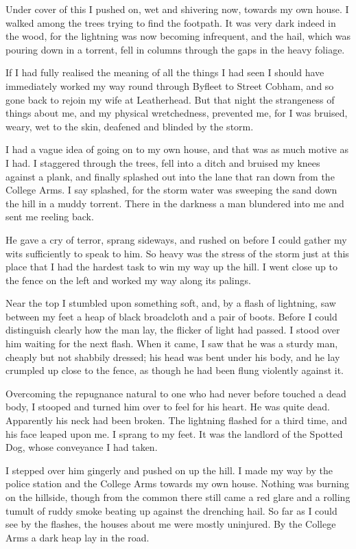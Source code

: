 Under cover of this I pushed on, wet and shivering now, towards my
own house. I walked among the trees trying to find the footpath. It
was very dark indeed in the wood, for the lightning was now
becoming infrequent, and the hail, which was pouring down in a
torrent, fell in columns through the gaps in the heavy foliage.

If I had fully realised the meaning of all the things I had seen I
should have immediately worked my way round through Byfleet to
Street Cobham, and so gone back to rejoin my wife at Leatherhead.
But that night the strangeness of things about me, and my physical
wretchedness, prevented me, for I was bruised, weary, wet to the
skin, deafened and blinded by the storm.

I had a vague idea of going on to my own house, and that was as
much motive as I had. I staggered through the trees, fell into a
ditch and bruised my knees against a plank, and finally splashed
out into the lane that ran down from the College Arms. I say
splashed, for the storm water was sweeping the sand down the hill
in a muddy torrent. There in the darkness a man blundered into me
and sent me reeling back.

He gave a cry of terror, sprang sideways, and rushed on before I
could gather my wits sufficiently to speak to him. So heavy was the
stress of the storm just at this place that I had the hardest task
to win my way up the hill. I went close up to the fence on the left
and worked my way along its palings.

Near the top I stumbled upon something soft, and, by a flash of
lightning, saw between my feet a heap of black broadcloth and a
pair of boots. Before I could distinguish clearly how the man lay,
the flicker of light had passed. I stood over him waiting for the
next flash. When it came, I saw that he was a sturdy man, cheaply
but not shabbily dressed; his head was bent under his body, and he
lay crumpled up close to the fence, as though he had been flung
violently against it.

Overcoming the repugnance natural to one who had never before
touched a dead body, I stooped and turned him over to feel for his
heart. He was quite dead. Apparently his neck had been broken. The
lightning flashed for a third time, and his face leaped upon me. I
sprang to my feet. It was the landlord of the Spotted Dog, whose
conveyance I had taken.

I stepped over him gingerly and pushed on up the hill. I made my
way by the police station and the College Arms towards my own
house. Nothing was burning on the hillside, though from the common
there still came a red glare and a rolling tumult of ruddy smoke
beating up against the drenching hail. So far as I could see by the
flashes, the houses about me were mostly uninjured. By the College
Arms a dark heap lay in the road.

